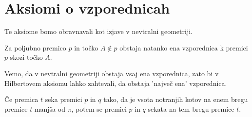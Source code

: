\section{Aksiomi o vzporednicah}

    Te aksiome bomo obravnavali kot izjave v nevtralni geometriji.

    \begin{aksiom}
        Za poljubno premico $p$ in točko $A\notin p$ obstaja natanko ena vzporednica k premici $p$ skozi točko $A$.
    \end{aksiom}


    \begin{opomba}
        Vemo, da v nevtralni geometriji obstaja vsaj ena vzporednica, zato bi v Hilbertovem aksiomu lahko zahtevali, da obstaja 'največ ena' vzporednica.
    \end{opomba}

    \begin{aksiom}
        Če premica $t$ seka premici $p$ in $q$ tako, da je vsota notranjih kotov na enem bregu premice $t$ manjša od $\pi$, potem se premici $p$ in $q$ sekata na tem bregu premice $t$.
    \end{aksiom}

